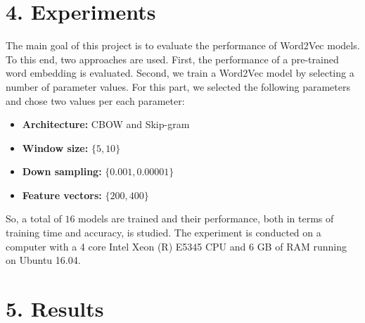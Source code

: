 \documentclass[12pt]{report}
\begin{document}
\section*{4. Experiments}
The main goal of this project is to evaluate the performance of Word2Vec models. To this end, two approaches are used. First, the performance of a pre-trained word embedding is evaluated. Second, we train a Word2Vec model by 
selecting a number of parameter values. For this part, we selected the following parameters and chose two values 
per each parameter:

\begin{itemize}
	\item \textbf{Architecture:} CBOW and Skip-gram
	\item \textbf{Window size:} $\{5, 10\}$
	\item \textbf{Down sampling:} $\{0.001, 0.00001\}$
	\item \textbf{Feature vectors:} $\{200, 400\}$
\end{itemize}

\noindent So, a total of $16$ models are trained and their performance, both in terms of training time and accuracy, is studied. The experiment is conducted on a computer with a 4 core Intel Xeon (R) E5345 CPU and 6 GB of RAM running on Ubuntu 16.04.

\section*{5. Results}
\end{document}

